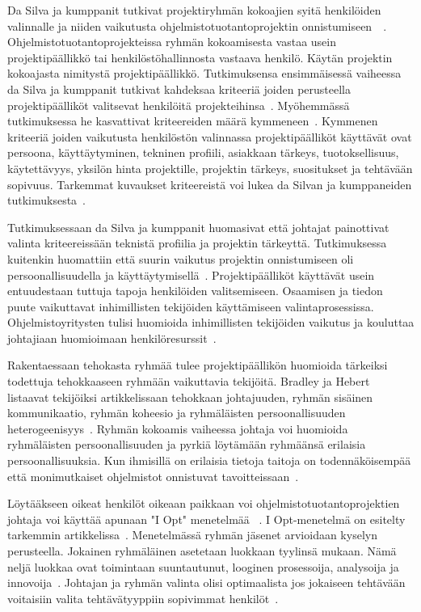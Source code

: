 \documentclass[finnish]{tktltiki2}
\theoremstyle{definition}
\theoremstyle{remark}
\begin{document}
Da Silva ja kumppanit tutkivat projektiryhmän kokoajien syitä henkilöiden valinnalle ja niiden vaikutusta ohjelmistotuotantoprojektin onnistumiseen~\cite{daSilva2012}~\cite{francca2009quantitative}. Ohjelmistotuotantoprojekteissa ryhmän kokoamisesta vastaa usein projektipäällikkö tai henkilöstöhallinnosta vastaava henkilö. Käytän projektin kokoajasta nimitystä projektipäällikkö. Tutkimuksensa ensimmäisessä vaiheessa da Silva ja kumppanit tutkivat kahdeksaa kriteeriä joiden perusteella projektipäälliköt valitsevat henkilöitä projekteihinsa~\cite{francca2009quantitative}. Myöhemmässä tutkimuksessa he kasvattivat kriteereiden määrä kymmeneen~\cite{daSilva2012}. Kymmenen kriteeriä joiden vaikutusta henkilöstön valinnassa projektipäälliköt käyttävät ovat persoona, käyttäytyminen, tekninen profiili, asiakkaan tärkeys, tuotoksellisuus, käytettävyys, yksilön hinta projektille, projektin tärkeys, suositukset ja tehtävään sopivuus. Tarkemmat kuvaukset kriteereistä voi lukea da Silvan ja kumppaneiden tutkimuksesta~\cite{daSilva2012}.

Tutkimuksessaan da Silva ja kumppanit huomasivat että johtajat painottivat valinta kriteereissään teknistä profiilia ja projektin tärkeyttä. Tutkimuksessa kuitenkin huomattiin että suurin vaikutus projektin onnistumiseen oli persoonallisuudella ja käyttäytymisellä~\cite{daSilva2012}. Projektipäälliköt käyttävät usein entuudestaan tuttuja tapoja henkilöiden valitsemiseen. Osaamisen ja tiedon puute vaikuttavat inhimillisten tekijöiden käyttämiseen valintaprosessissa. Ohjelmistoyritysten tulisi huomioida inhimillisten tekijöiden vaikutus ja kouluttaa johtajiaan huomioimaan henkilöresurssit~\cite{daSilva2012}.

Rakentaessaan tehokasta ryhmää tulee projektipäällikön huomioida tärkeiksi todettuja tehokkaaseen ryhmään vaikuttavia tekijöitä. Bradley ja Hebert listaavat tekijöiksi artikkelissaan tehokkaan johtajuuden, ryhmän sisäinen kommunikaatio, ryhmän koheesio ja ryhmäläisten persoonallisuuden heterogeenisyys~\cite{bradley1997effect}. Ryhmän kokoamis vaiheessa johtaja voi huomioida ryhmäläisten persoonallisuuden ja pyrkiä löytämään ryhmäänsä erilaisia persoonallisuuksia. Kun ihmisillä on erilaisia tietoja taitoja on todennäköisempää että monimutkaiset ohjelmistot onnistuvat tavoitteissaan~\cite{bradley1997effect}.

Löytääkseen oikeat henkilöt oikeaan paikkaan voi ohjelmistotuotantoprojektien johtaja voi käyttää apunaan "I Opt" menetelmää ~\cite{Dhomne:2012:ITL:2382887.2382899}. I Opt-menetelmä on esitelty tarkemmin artikkelissa~\cite{ kliem1996teambuilding}. Menetelmässä ryhmän jäsenet arvioidaan kyselyn perusteella. Jokainen ryhmäläinen asetetaan luokkaan tyylinsä mukaan. Nämä neljä luokkaa ovat toimintaan suuntautunut, looginen prosessoija, analysoija ja innovoija~\cite{ kliem1996teambuilding}. Johtajan ja ryhmän valinta olisi optimaalista jos jokaiseen tehtävään voitaisiin valita tehtävätyyppiin sopivimmat henkilöt~\cite{Dhomne:2012:ITL:2382887.2382899}.
\end{document}
